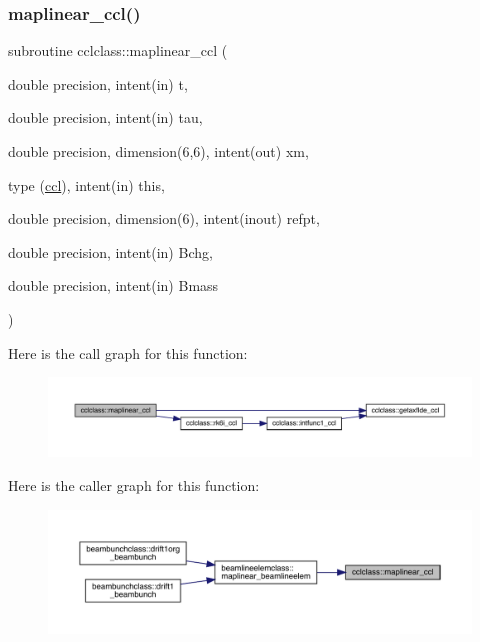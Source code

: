 \subsubsection{\texorpdfstring{maplinear\_ccl()}{maplinear\_ccl()}}
{\footnotesize\ttfamily subroutine cclclass\+::maplinear\+\_\+ccl (\begin{DoxyParamCaption}\item[{double precision, intent(in)}]{t,  }\item[{double precision, intent(in)}]{tau,  }\item[{double precision, dimension(6,6), intent(out)}]{xm,  }\item[{type (\mbox{\hyperlink{namespacecclclass_structcclclass_1_1ccl}{ccl}}), intent(in)}]{this,  }\item[{double precision, dimension(6), intent(inout)}]{refpt,  }\item[{double precision, intent(in)}]{Bchg,  }\item[{double precision, intent(in)}]{Bmass }\end{DoxyParamCaption})}

Here is the call graph for this function\+:\nopagebreak
\begin{figure}[H]
\begin{center}
\leavevmode
\includegraphics[width=350pt]{namespacecclclass_a2efbf5186624893a0f213ca40968c198_cgraph}
\end{center}
\end{figure}
Here is the caller graph for this function\+:\nopagebreak
\begin{figure}[H]
\begin{center}
\leavevmode
\includegraphics[width=350pt]{namespacecclclass_a2efbf5186624893a0f213ca40968c198_icgraph}
\end{center}
\end{figure}
\mbox{\label{namespacecclclass_a6dd4075592b69b308b61e3ee2f065517}} 
